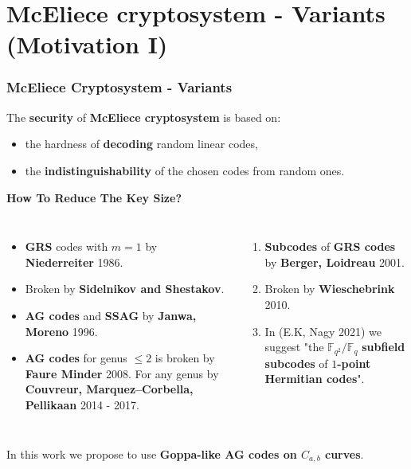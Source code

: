 \documentclass[
10pt, %
%
aspectratio=169, %
]{beamer}
\theoremstyle{plain}%
\theoremstyle{definition}
\theoremstyle{remark}
\newcommand{\fq}{\mathbb{F}_{q}}
\begin{document}
	\section{McEliece cryptosystem - Variants (Motivation I)}
	\begin{frame}
		\frametitle{McEliece Cryptosystem - Variants}
		The \textbf{security} of \textbf{McEliece cryptosystem} is based on:
		\begin{itemize}
			\item the hardness of \textbf{decoding} random linear codes,
			\item the \textbf{indistinguishability} of the chosen codes from random ones.
		\end{itemize}
		
		
		\textcolor{palatinatepurple}{\textbf{How To Reduce The Key Size?}}
		
		\begin{columns}[T,onlytextwidth]
			\begin{itemize}
				\item[\textcolor{palatinatepurple}{\faIcon{file-alt}}] \textbf{GRS} codes with $m = 1$ by \textbf{Niederreiter} 1986.
				\item[\textcolor{amaranth}{\faFrownOpen}] Broken by
				\textbf{Sidelnikov and Shestakov}.
				\item[\textcolor{palatinatepurple}{\faIcon{file-alt}}] \textbf{AG codes} and \textbf{\textcolor{applegreen}{SSAG}} by \textbf{Janwa, Moreno} 1996.
				\item[\textcolor{amaranth}{\faFrownOpen}]\textbf{ AG codes} for genus $\leq 2$ is broken by \textbf{Faure Minder} 2008. For any genus by \textbf{Couvreur, Marquez–Corbella, Pellikaan} 2014 - 2017.
			\end{itemize}
			\begin{enumerate}
				\item[\textcolor{palatinatepurple}{\faIcon{file-alt}}] \textbf{Subcodes} of \textbf{GRS codes} by \textbf{Berger, Loidreau} 2001.
				\item[\textcolor{amaranth}{\faFrownOpen}] Broken by \textbf{Wieschebrink} 2010.
				\item[\textcolor{applegreen}{\faIcon{file-alt}}] In (E.K, Nagy 2021) we suggest "the $\mathbb{F}_{q^2}/\fq$ \textbf{subfield subcodes} of $1$\textbf{-point Hermitian codes}".
			\end{enumerate}
		\end{columns}
		\vspace{0.3em}
		\begin{tcolorbox}[colback=white,colframe=palatinatepurple]
			\textcolor{applegreen}{} In this work we propose to use \textbf{Goppa-like AG codes on $C_{a,b}$ curves}.
		\end{tcolorbox}
	\end{frame}
	
\end{document}
